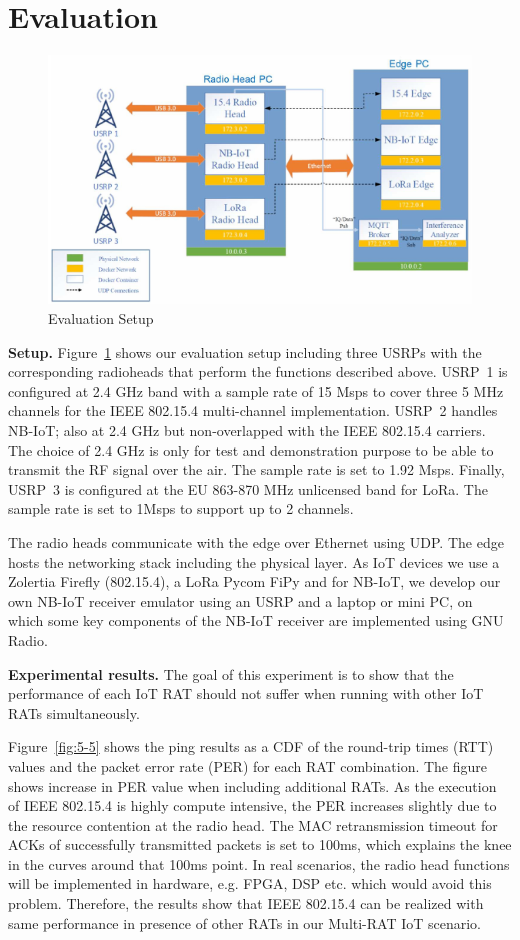 \documentclass[10pt,emptycopyrightspace]{ewsn-proc}
\newcommand{\fakepar}[1]{\noindent\textbf{#1.}}
\begin{document}

\section{Evaluation}

\begin{figure}[t]
  \vspace{-0.5cm}
  \centering
	\includegraphics[width= 0.40 \textwidth]{setup-alt.png}
	\caption{Evaluation Setup}
	\label{fig:setup}
\end{figure}

\fakepar{Setup} Figure~\ref{fig:setup} shows our evaluation setup including
three USRPs with the corresponding radioheads that perform the
functions described above. USRP~1 is configured at 2.4 GHz
band with a sample rate of 15 Msps to cover three 5 MHz channels for
the IEEE 802.15.4 multi-channel implementation. USRP~2 handles NB-IoT;
also at 2.4 GHz but non-overlapped with the IEEE 802.15.4
carriers. The choice of 2.4 GHz is only for test and demonstration
purpose to be able to transmit the RF signal over the air. The sample
rate is set to 1.92 Msps. Finally, USRP~3 is
configured at the EU 863-870 MHz unlicensed band for LoRa. The sample
rate is set to 1Msps to support up to 2 channels.

The radio heads communicate with the edge over Ethernet using UDP. The edge hosts the networking stack including the physical layer. As IoT devices we use a Zolertia Firefly (802.15.4), a LoRa  Pycom FiPy and for NB-IoT, we develop our own NB-IoT receiver emulator using an USRP and a laptop or mini PC, on which some key components of the NB-IoT receiver are implemented using GNU Radio.

\fakepar{Experimental results}
The goal of this experiment is to show that the
performance of each IoT RAT should not suffer when running with other IoT RATs simultaneously.

Figure~\ref{fig:5-5} shows the ping results as a CDF of
the round-trip times (RTT) values and the packet error rate (PER) for
each RAT combination.  The figure shows increase in PER value when
including additional RATs.  As the execution of IEEE 802.15.4 is
highly compute intensive, the PER increases
slightly due to the resource contention at the radio head. The MAC retransmission timeout for ACKs of
successfully transmitted packets is set to 100ms, which explains the
knee in the curves around that 100ms point.
In real scenarios, the radio head functions will be implemented in
hardware, e.g. FPGA, DSP etc. which would avoid this
problem. Therefore, the results show that IEEE 802.15.4 can be
realized with same performance in presence of other RATs in our
Multi-RAT IoT scenario.
\end{document}
